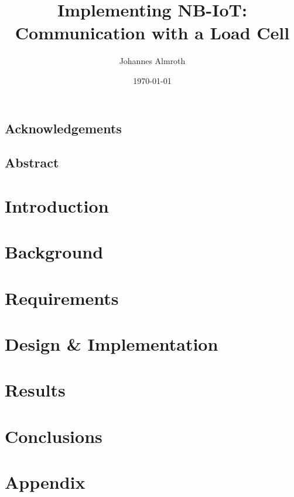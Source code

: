 \documentclass[11pt,titlepage,openright]{book}
\begin{document}
\frontmatter
\title{Implementing NB-IoT: Communication with a Load Cell}
\author{Johannes Almroth}
\date{\today}

\maketitle

\vspace*{3cm}
\section*{Acknowledgements}

\newpage

\vspace*{3cm}
\section*{Abstract}



\tableofcontents
\listoffigures

\mainmatter

\chapter{Introduction}


\chapter{Background}


\chapter{Requirements}


\chapter{Design \& Implementation}


\chapter{Results}


\chapter{Conclusions}


\chapter{Appendix}




\end{document}
